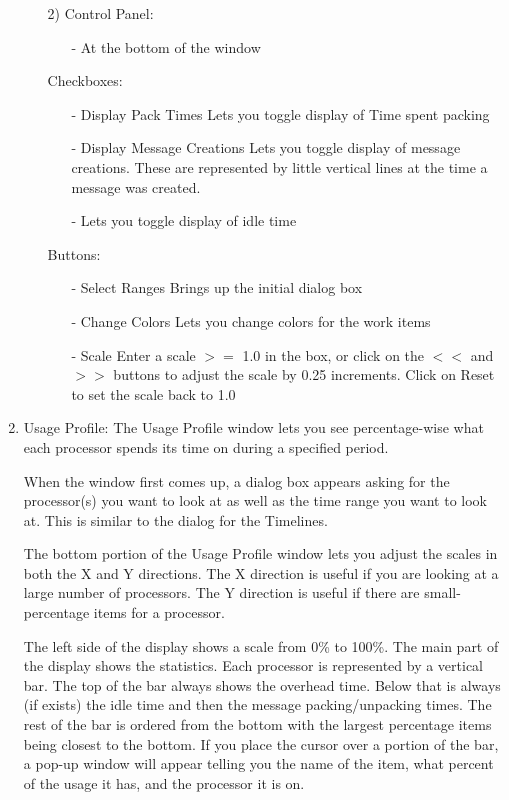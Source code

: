 \begin{enumerate}
\begin{enumerate}
   \item[2)]
      Control Panel:
      \begin{itemize}
      \item[-]
        At the bottom of the window
      \end{itemize}
      Checkboxes:
      \begin{itemize}
      \item[-]
        Display Pack Times
        Lets you toggle display of Time spent packing
      \item[-]
        Display Message Creations
        Lets you toggle display of message creations. These are represented
        by little vertical lines at the time a message was created.
      \item[-]
        Lets you toggle display of idle time
      \end{itemize}
      Buttons:
      \begin{itemize}
      \item[-]
        Select Ranges
        Brings up the initial dialog box
      \item[-]
        Change Colors
        Lets you change colors for the work items
      \item[-]
        Scale
        Enter a scale $>=$ 1.0 in the box, or click on the $<<$ and $>>$ buttons to
        adjust the scale by 0.25 increments.  Click on Reset to set the scale
        back to 1.0
      \end{itemize}
   \end{enumerate}

\item
Usage Profile:
   The Usage Profile window lets you see percentage-wise what each processor
   spends its time on during a specified period.

   When the window first comes up, a dialog box appears asking for the
   processor(s) you want to look at as well as the time range you want to look
   at.  This is similar to the dialog for the Timelines.

   The bottom portion of the Usage Profile window lets you adjust the scales in
   both the X and Y directions.  The X direction is useful if you are looking at
   a large number of processors.  The Y direction is useful if there are
   small-percentage items for a processor.

   The left side of the display shows a scale from 0\% to 100\%.  The main part of
   the display shows the statistics.  Each processor is represented by a
   vertical bar.  The top of the bar always shows the overhead time.  Below that
   is always (if exists) the idle time and then the message packing/unpacking
   times.  The rest of the bar is ordered from the bottom with the largest
   percentage items being closest to the bottom.  If you place the cursor over a
   portion of the bar, a pop-up window will appear telling you the name of the
   item, what percent of the usage it has, and the processor it is on.


\end{enumerate}
